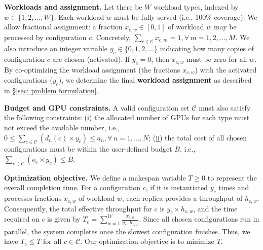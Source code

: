 \textbf{Workloads and assignment.} Let there be $W$ workload types, indexed by $w \in \{1,2,\dots,W\}$. Each workload $w$ must be fully served (i.e., 100\% coverage). We allow fractional assignment: a fraction $x_{c,w} \in [0,1]$ of workload $w$ may be processed by configuration $c$. Concretely, $\sum_{c \in \mathcal{C}} x_{c,m} = 1, \forall\, m=1,2,\dots,M$. 
We also introduce an integer variable $y_{c} \in \{0,1,2,\dots\}$ indicating how many copies of configuration $c$ are chosen (activated). If $y_c = 0$, then $x_{c,w}$ must be zero for all $w$. By co-optimizing the workload assignment (the fractions $x_{c,w}$) with the activated configurations ($y_c$), we determine the final \textbf{workload assignment} as described in \S\ref{sec: problem formulation}.


\textbf{Budget and GPU constraints.} A valid configuration set \(\mathcal{C}\) must also satisfy the following constraints: (\underline{i}) the allocated number of GPUs for each type must not exceed the available number, i.e., $0 \leq \sum_{c \in \mathcal{C}} (d_n(c) \times y_c) \leq a_n, \forall\,n=1,\dots,N$; (\underline{ii}) the total cost of all chosen configurations must be within the user-defined budget \(B\), i.e., $\sum_{c \in \mathcal{C}} (o_c \times y_c) \le B$.


\textbf{Optimization objective.} We define a makespan variable \(T \geq 0\) to represent the overall completion time. For a configuration \(c\), if it is instantiated \(y_c\) times and processes fractions \(x_{c,w}\) of workload \(w\), each replica provides a throughput of \(h_{c,w}\). Consequently, the total effective throughput for \(c\) is \(y_c \times h_{c,w}\), and the time required on \(c\) is given by $T_c = \sum_{w=1}^{W} \frac{x_{c,w}}{y_c \cdot h_{c,w}}.$ Since all chosen configurations run in parallel, the system completes once the slowest configuration finishes. Thus, we have \(T_c \leq T\) for all \(c \in \mathcal{C}\). Our optimization objective is to minimize \(T\).


